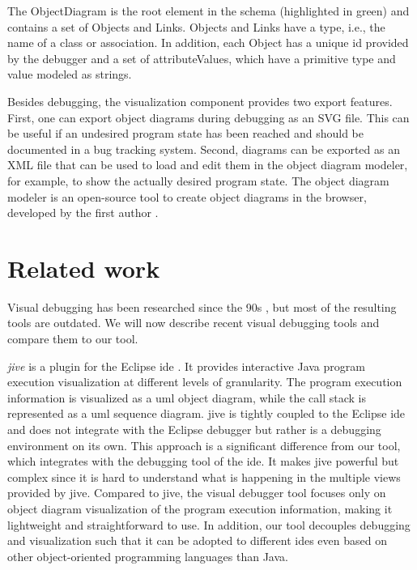 \documentclass[conference]{IEEEtran}
\begin{document}
The \textsf{ObjectDiagram} is the root element in the schema (highlighted in green) and contains a set of \textsf{Objects} and \textsf{Links}.
\textsf{Objects} and \textsf{Links} have a \textsf{type}, i.e., the name of a class or association.
In addition, each \textsf{Object} has a unique \textsf{id} provided by the debugger and a set of \textsf{attributeValues}, which have a primitive \textsf{type} and \textsf{value} modeled as strings.

Besides debugging, the visualization component provides two export features.
First, one can export object diagrams during debugging as an SVG file.
This can be useful if an undesired program state has been reached and should be documented in a bug tracking system.
Second, diagrams can be exported as an XML file that can be used to load and edit them in the object diagram modeler, for example, to show the actually desired program state.
The object diagram modeler is an open-source tool to create object diagrams in the browser, developed by the first author \cite{ObjectDiagramModeler2022}.

\section{Related work} \label{sec:relatedWork}
Visual debugging has been researched since the 90s \cite{baeza-yatesVisualDebuggingAutomatic1996, jerdingUsingVisualizationFoster1994, mukherjeaVisualDebuggingIntegrating1994, hansonSimpleExtensibleGraphical1997}, but most of the resulting tools are outdated.
We will now describe recent visual debugging tools and compare them to our tool.

\textit{\gls*{jive}} is a plugin for the Eclipse \gls*{ide} \cite{czyzDeclarativeVisualDebugging2007,k.p.FiniteStateModel2021, JIVEJavaInteractive}.
It provides interactive Java program execution visualization at different levels of granularity.
The program execution information is visualized as a \gls*{uml} object diagram, while the call stack is represented as a \gls*{uml} sequence diagram.
\gls*{jive} is tightly coupled to the Eclipse \gls*{ide} and does not integrate with the Eclipse debugger but rather is a debugging environment on its own.
This approach is a significant difference from our tool, which integrates with the debugging tool of the \gls*{ide}.
It makes \gls*{jive} powerful but complex since it is hard to understand what is happening in the multiple views provided by \gls*{jive}.
Compared to \gls*{jive}, the visual debugger tool focuses only on object diagram visualization of the program execution information, making it lightweight and straightforward to use.
In addition, our tool decouples debugging and visualization such that it can be adopted to different \glspl*{ide} even based on other object-oriented programming languages than Java.
\end{document}
